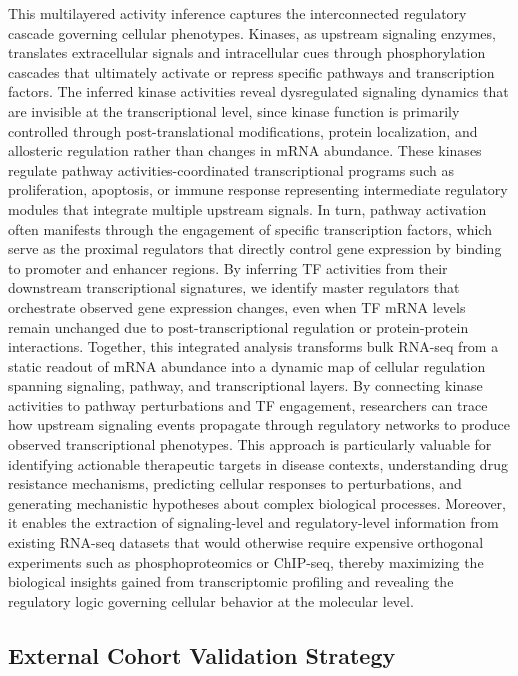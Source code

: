 \documentclass[pdflatex,article,12pt]{article}
\begin{document}
This multilayered activity inference captures the interconnected regulatory cascade governing cellular phenotypes. Kinases, as upstream signaling enzymes, translates extracellular signals and intracellular cues through phosphorylation cascades that ultimately activate or repress specific pathways and transcription factors. The inferred kinase activities reveal dysregulated signaling dynamics that are invisible at the transcriptional level, since kinase function is primarily controlled through post-translational modifications, protein localization, and allosteric regulation rather than changes in mRNA abundance. These kinases regulate pathway activities-coordinated transcriptional programs such as proliferation, apoptosis, or immune response representing intermediate regulatory modules that integrate multiple upstream signals. In turn, pathway activation often manifests through the engagement of specific transcription factors, which serve as the proximal regulators that directly control gene expression by binding to promoter and enhancer regions. By inferring TF activities from their downstream transcriptional signatures, we identify master regulators that orchestrate observed gene expression changes, even when TF mRNA levels remain unchanged due to post-transcriptional regulation or protein-protein interactions.
Together, this integrated analysis transforms bulk RNA-seq from a static readout of mRNA abundance into a dynamic map of cellular regulation spanning signaling, pathway, and transcriptional layers. By connecting kinase activities to pathway perturbations and TF engagement, researchers can trace how upstream signaling events propagate through regulatory networks to produce observed transcriptional phenotypes. This approach is particularly valuable for identifying actionable therapeutic targets in disease contexts, understanding drug resistance mechanisms, predicting cellular responses to perturbations, and generating mechanistic hypotheses about complex biological processes. Moreover, it enables the extraction of signaling-level and regulatory-level information from existing RNA-seq datasets that would otherwise require expensive orthogonal experiments such as phosphoproteomics or ChIP-seq, thereby maximizing the biological insights gained from transcriptomic profiling and revealing the regulatory logic governing cellular behavior at the molecular level.




\subsection{External Cohort Validation Strategy}
\end{document}
